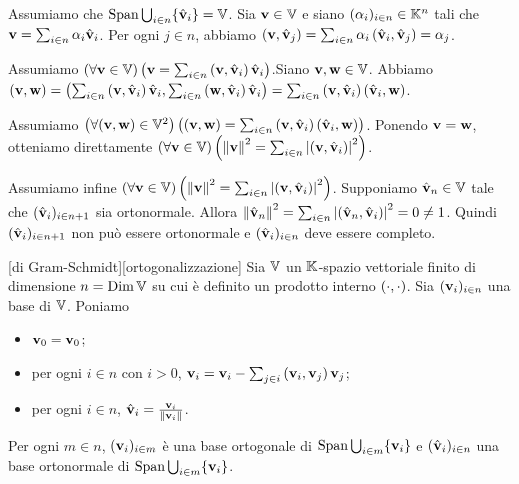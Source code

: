 \par Assumiamo che $\operatorname{\operatorname{Span}}{\bigcup_{i \in n} \lbrace \hat{\mathbf{v}}_i \rbrace} = \mathbb{V}$. Sia $\mathbf{v} \in \mathbb{V}$ e siano $(\alpha_i)_{i \in n} \in \mathbb{K}^n$ tali che $\mathbf{v} = \sum_{i \in n} \alpha_i \hat{\mathbf{v}}_i$. Per ogni $j \in n$, abbiamo $\left ( \mathbf{v} , \hat{\mathbf{v}}_j \right ) = \sum_{i \in n} \alpha_i \left ( \hat{\mathbf{v}}_i , \hat{\mathbf{v}}_j \right ) = \alpha_j$.
\par Assumiamo $\left ( \forall \mathbf{v} \in \mathbb{V} \right ) \left ( \mathbf{v} = \sum_{i \in n} \left ( \mathbf{v} , \hat{\mathbf{v}}_i \right )\hat{\mathbf{v}}_i \right )$.Siano $\mathbf{v}, \mathbf{w} \in \mathbb{V}$. Abbiamo $\left ( \mathbf{v} , \mathbf{w} \right ) = \left ( \sum_{i \in n} \left ( \mathbf{v} , \hat{\mathbf{v}}_i \right )\hat{\mathbf{v}}_i , \sum_{i \in n} \left ( \mathbf{w} , \hat{\mathbf{v}}_i \right )\hat{\mathbf{v}}_i \right ) = \sum_{i \in n} \left ( \mathbf{v} , \hat{\mathbf{v}}_i \right )\left ( \hat{\mathbf{v}}_i , \mathbf{w} \right )$.
\par Assumiamo $\left ( \forall (\mathbf{v},\mathbf{w}) \in \mathbb{V}^2 \right ) \left ( \left ( \mathbf{v} , \mathbf{w} \right ) = \sum_{i \in n} \left ( \mathbf{v} , \hat{\mathbf{v}}_i \right )\left ( \hat{\mathbf{v}}_i , \mathbf{w} \right ) \right )$. Ponendo $\mathbf{v} = \mathbf{w}$, otteniamo direttamente $\ForAll{\Vector \in \LinearSpace}{\Norm{\Vector}^2 = \sum_{i \in n}{\AbsoluteValue{\InnerProduct{\Vector}{\OrthonormalBase_i}}}^2}$.
\par Assumiamo infine $\ForAll{\Vector \in \LinearSpace}{\Norm{\Vector}^2 = \sum_{i \in n}\AbsoluteValue{\InnerProduct{\Vector}{\OrthonormalBase_i}}^2}$. Supponiamo $\hat{\mathbf{v}}_n \in \mathbb{V}$ tale che $(\hat{\mathbf{v}}_i)_{i \in n + 1}$ sia ortonormale. Allora $\Norm{\OrthonormalBase_n}^2 = \sum_{i \in n} \AbsoluteValue{\InnerProduct{\OrthonormalBase_n}{\OrthonormalBase_i}}^2 = 0 \neq 1$. Quindi $(\hat{\mathbf{v}}_i)_{i \in n + 1}$ non pu\`o essere ortonormale e $(\hat{\mathbf{v}}_i)_{i \in n}$ deve essere completo. \EndProof
\begin{Theorem}
	[di Gram-Schmidt][ortogonalizzazione]
  Sia $\mathbb{V}$ un $\mathbb{K}$-spazio vettoriale finito di dimensione
  $n = \operatorname{\operatorname{Dim}}{\mathbb{V}}$ su cui \`e definito un prodotto interno
  $\left ( \cdot , \cdot \right )$. Sia $(\mathbf{v}_i)_{i \in n}$ una base di
  $\mathbb{V}$. Poniamo
	\begin{itemize}
		\item $\mathbf{v}_0 = \mathbf{v}_0$;
		\item per ogni $i \in n$ con $i > 0$,
      $\mathbf{v}_i
        = \mathbf{v}_i - \sum_{j \in i}
          \left ( \mathbf{v}_i , \mathbf{v}_j \right )\mathbf{v}_j$;
		\item per ogni $i \in n$,
      $\OrthonormalBase_i = \frac{\OrthogonalBase_i}{\Norm{\OrthogonalBase_i}}$.
	\end{itemize}
	Per ogni $m \in n$, $(\mathbf{v}_i)_{i \in m}$ \`e una base ortogonale di
  $\operatorname{\operatorname{Span}}{\bigcup_{i \in m} \lbrace \mathbf{v}_i \rbrace}$
  e
  $(\hat{\mathbf{v}}_i)_{i \in n}$ una base ortonormale di
  $\operatorname{\operatorname{Span}}{\bigcup_{i \in m} \lbrace \mathbf{v}_i \rbrace}$.
\end{Theorem}
